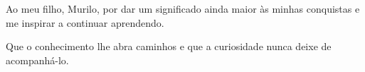 \begin{dedicatoria}
  \vspace*{\fill}
  \noindent
  \raggedleft
  \begin{minipage}{.54\textwidth}
    Ao meu filho, Murilo, por dar um significado ainda maior às minhas conquistas e me inspirar a continuar aprendendo.

    Que o conhecimento lhe abra caminhos e que a curiosidade nunca deixe de acompanhá-lo.
  \end{minipage}
\end{dedicatoria}
